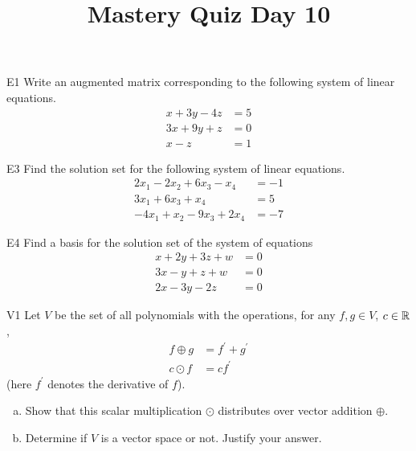 \documentclass{sbgLAquiz}
\title{Mastery Quiz Day 10 }
\begin{document}
\begin{problem}{E1}
Write an augmented matrix corresponding to the following system of linear equations.
\begin{align*}
x+3y-4z &= 5 \\
3x+9y+z &= 0 \\
x-z &= 1
\end{align*}
\end{problem}

\begin{problem}{E3}
Find the solution set for the following system of linear equations.
\begin{align*}
2x_1-2x_2+6x_3-x_4 &=-1 \\
3x_1+6x_3+x_4 &= 5 \\
-4x_1+x_2-9x_3+2x_4&=-7
\end{align*}
\end{problem}
\newpage

\begin{problem}{E4}
Find a basis for the solution set of the system of equations
\begin{align*}
x+2y+3z+w &= 0 \\
3x-y+z+w &= 0 \\
2x-3y-2z &= 0
\end{align*}
\end{problem}

\begin{problem}{V1}
Let $V$ be the set of all polynomials with the operations, for any $f, g \in V$, $c \in \mathbb{R}$,
\begin{align*}
f \oplus g &= f^\prime + g^\prime \\
c \odot f &= c f^\prime
\end{align*}
(here $f^\prime$ denotes the derivative of $f$).
\begin{enumerate}[(a)]
\item Show that this scalar multiplication $\odot$ distributes over vector addition $\oplus$.
\item Determine if $V$ is a vector space or not.  Justify your answer.
\end{enumerate}
\end{problem}
\end{document}
